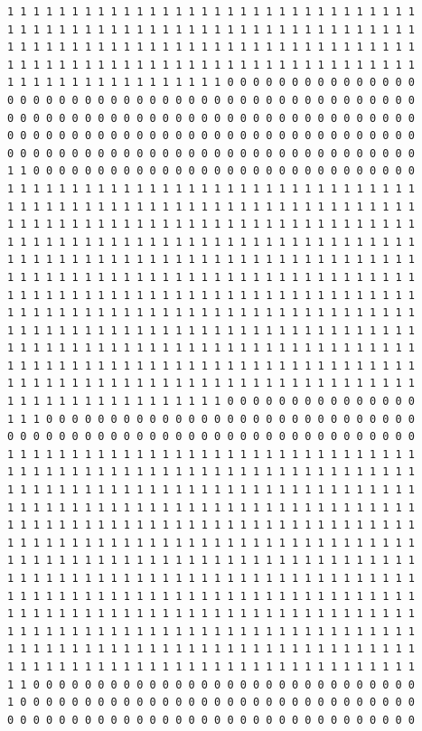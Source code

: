 \documentclass [10 pt, a4 paper]{report}
\begin{document}
\begin{lstlisting}[caption=Output of the simulation once it is finished, label={lst:code1}, frame=single]
1 1 1 1 1 1 1 1 1 1 1 1 1 1 1 1 1 1 1 1 1 1 1 1 1 1 1 1 1 1 1 1
1 1 1 1 1 1 1 1 1 1 1 1 1 1 1 1 1 1 1 1 1 1 1 1 1 1 1 1 1 1 1 1
1 1 1 1 1 1 1 1 1 1 1 1 1 1 1 1 1 1 1 1 1 1 1 1 1 1 1 1 1 1 1 1
1 1 1 1 1 1 1 1 1 1 1 1 1 1 1 1 1 1 1 1 1 1 1 1 1 1 1 1 1 1 1 1
1 1 1 1 1 1 1 1 1 1 1 1 1 1 1 1 1 0 0 0 0 0 0 0 0 0 0 0 0 0 0 0
0 0 0 0 0 0 0 0 0 0 0 0 0 0 0 0 0 0 0 0 0 0 0 0 0 0 0 0 0 0 0 0
0 0 0 0 0 0 0 0 0 0 0 0 0 0 0 0 0 0 0 0 0 0 0 0 0 0 0 0 0 0 0 0
0 0 0 0 0 0 0 0 0 0 0 0 0 0 0 0 0 0 0 0 0 0 0 0 0 0 0 0 0 0 0 0
0 0 0 0 0 0 0 0 0 0 0 0 0 0 0 0 0 0 0 0 0 0 0 0 0 0 0 0 0 0 0 0
1 1 0 0 0 0 0 0 0 0 0 0 0 0 0 0 0 0 0 0 0 0 0 0 0 0 0 0 0 0 0 0
1 1 1 1 1 1 1 1 1 1 1 1 1 1 1 1 1 1 1 1 1 1 1 1 1 1 1 1 1 1 1 1
1 1 1 1 1 1 1 1 1 1 1 1 1 1 1 1 1 1 1 1 1 1 1 1 1 1 1 1 1 1 1 1
1 1 1 1 1 1 1 1 1 1 1 1 1 1 1 1 1 1 1 1 1 1 1 1 1 1 1 1 1 1 1 1
1 1 1 1 1 1 1 1 1 1 1 1 1 1 1 1 1 1 1 1 1 1 1 1 1 1 1 1 1 1 1 1
1 1 1 1 1 1 1 1 1 1 1 1 1 1 1 1 1 1 1 1 1 1 1 1 1 1 1 1 1 1 1 1
1 1 1 1 1 1 1 1 1 1 1 1 1 1 1 1 1 1 1 1 1 1 1 1 1 1 1 1 1 1 1 1
1 1 1 1 1 1 1 1 1 1 1 1 1 1 1 1 1 1 1 1 1 1 1 1 1 1 1 1 1 1 1 1
1 1 1 1 1 1 1 1 1 1 1 1 1 1 1 1 1 1 1 1 1 1 1 1 1 1 1 1 1 1 1 1
1 1 1 1 1 1 1 1 1 1 1 1 1 1 1 1 1 1 1 1 1 1 1 1 1 1 1 1 1 1 1 1
1 1 1 1 1 1 1 1 1 1 1 1 1 1 1 1 1 1 1 1 1 1 1 1 1 1 1 1 1 1 1 1
1 1 1 1 1 1 1 1 1 1 1 1 1 1 1 1 1 1 1 1 1 1 1 1 1 1 1 1 1 1 1 1
1 1 1 1 1 1 1 1 1 1 1 1 1 1 1 1 1 1 1 1 1 1 1 1 1 1 1 1 1 1 1 1
1 1 1 1 1 1 1 1 1 1 1 1 1 1 1 1 1 0 0 0 0 0 0 0 0 0 0 0 0 0 0 0
1 1 1 0 0 0 0 0 0 0 0 0 0 0 0 0 0 0 0 0 0 0 0 0 0 0 0 0 0 0 0 0
0 0 0 0 0 0 0 0 0 0 0 0 0 0 0 0 0 0 0 0 0 0 0 0 0 0 0 0 0 0 0 0
1 1 1 1 1 1 1 1 1 1 1 1 1 1 1 1 1 1 1 1 1 1 1 1 1 1 1 1 1 1 1 1
1 1 1 1 1 1 1 1 1 1 1 1 1 1 1 1 1 1 1 1 1 1 1 1 1 1 1 1 1 1 1 1
1 1 1 1 1 1 1 1 1 1 1 1 1 1 1 1 1 1 1 1 1 1 1 1 1 1 1 1 1 1 1 1
1 1 1 1 1 1 1 1 1 1 1 1 1 1 1 1 1 1 1 1 1 1 1 1 1 1 1 1 1 1 1 1
1 1 1 1 1 1 1 1 1 1 1 1 1 1 1 1 1 1 1 1 1 1 1 1 1 1 1 1 1 1 1 1
1 1 1 1 1 1 1 1 1 1 1 1 1 1 1 1 1 1 1 1 1 1 1 1 1 1 1 1 1 1 1 1
1 1 1 1 1 1 1 1 1 1 1 1 1 1 1 1 1 1 1 1 1 1 1 1 1 1 1 1 1 1 1 1
1 1 1 1 1 1 1 1 1 1 1 1 1 1 1 1 1 1 1 1 1 1 1 1 1 1 1 1 1 1 1 1
1 1 1 1 1 1 1 1 1 1 1 1 1 1 1 1 1 1 1 1 1 1 1 1 1 1 1 1 1 1 1 1
1 1 1 1 1 1 1 1 1 1 1 1 1 1 1 1 1 1 1 1 1 1 1 1 1 1 1 1 1 1 1 1
1 1 1 1 1 1 1 1 1 1 1 1 1 1 1 1 1 1 1 1 1 1 1 1 1 1 1 1 1 1 1 1
1 1 1 1 1 1 1 1 1 1 1 1 1 1 1 1 1 1 1 1 1 1 1 1 1 1 1 1 1 1 1 1
1 1 1 1 1 1 1 1 1 1 1 1 1 1 1 1 1 1 1 1 1 1 1 1 1 1 1 1 1 1 1 1
1 1 0 0 0 0 0 0 0 0 0 0 0 0 0 0 0 0 0 0 0 0 0 0 0 0 0 0 0 0 0 0
1 0 0 0 0 0 0 0 0 0 0 0 0 0 0 0 0 0 0 0 0 0 0 0 0 0 0 0 0 0 0 0
0 0 0 0 0 0 0 0 0 0 0 0 0 0 0 0 0 0 0 0 0 0 0 0 0 0 0 0 0 0 0 0

\end{lstlisting}
\end{document}
